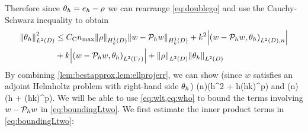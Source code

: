 Therefore since $\theta_{h} = e_{h} - \rho$ we can rearrange \cref{eq:doublego} and use the Cauchy-Schwarz inequality to obtain
\begin{align}
\NLtD{\thetah}^2 &\leq \Cc\nmax \NHokD{\rho} \NHokD{w- \Ph w} + k^2 \abs{\IPLtDn{w- \Ph w}{\thetah}}\nonumber\\
&+ k \abs{\IPLtGI{w-\Ph w}{\thetah}} + \NLtD{\rho}\NLtD{\thetah}\label{eq:boundingLtwo}
\end{align}
By combining \cref{lem:bestapprox,lem:ellprojerr}, we can show (since $w$ satisfies an adjoint Helmholtz problem with right-hand side $\theta_{h}$)
\beq\label{eq:wlt}
 \leq {} \mleft(n\mright)\mleft(\CFEMotilde h^2 + \CFEMttilde \CAnk h(hk)^p\mright)\NLtD{\thetah}
\eeq
and
\beq\label{eq:who}
  \mleft(n\mright)\mleft(\CFEMotilde h + \CFEMttilde \CAnk (hk)^p\mright)\NLtD{\thetah}.
\eeq
We will be able to use \cref{eq:wlt,eq:who} to bound the terms involving $w - \mathcal P_{h} w$ in \cref{eq:boundingLtwo}. We first estimate the inner product terms in \cref{eq:boundingLtwo}:
